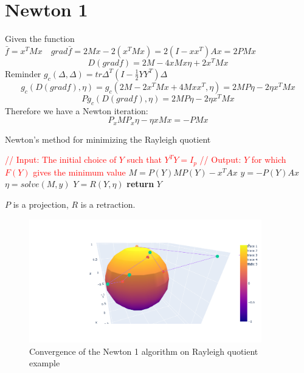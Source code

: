 \documentclass[11pt,a4paper]{report}
\begin{document}
\section{Newton 1}
Given the function $\bar{f}= x^T M x \quad grad \bar{f} = 2 M x  - 2 (x^T M x) = 2 (I - xx^T) A x = 2 P M x$
$$ D(grad f) = 2M - 4 x M x \eta + 2 x^T M x $$
Reminder $g_c(\Delta,\Delta) = tr \Delta^T (I - \frac{1}{2} Y Y^T) \Delta$
$$ g_c (D(grad f), \eta ) = g_c(2M - 2x^T M x + 4M x x^T, \eta) = 2 M  P \eta  - 2 \eta x^T M x  $$
$$ P g_c(D(grad f), \eta) = 2 M P \eta - 2 \eta x^T M x$$
Therefore we have a Newton iteration:
$$ P_x M P_x \eta - \eta x M x = - P M x$$
\begin{algorithm}
\caption{Newton's method for minimizing the Rayleigh quotient}
    \begin{algorithmic}[1]
        \State \textcolor{red}{// Input: The initial choice of $Y$ such that $Y^T Y = I_p$}
        \State \textcolor{red}{// Output: $Y$ for which $F(Y)$ gives the minimum value}
        \State $M = P(Y) M P(Y) - x^T A x $
        \State $y = - P(Y) A x$
        \State $\eta = solve(M,y)$
        \State $Y = R(Y, \eta)$
        \EndWhile
        \State \textbf{return} $Y$
        \EndProcedure
    \end{algorithmic}
\end{algorithm}
$P$ is a projection, $R$ is a retraction.

\begin{figure}[h] \label{gradR1}
    \centering
    \includegraphics[width=0.90\textwidth]{newton1.png}
    \caption{Convergence of the Newton 1 algorithm on Rayleigh quotient example}
\end{figure}
\end{document}
